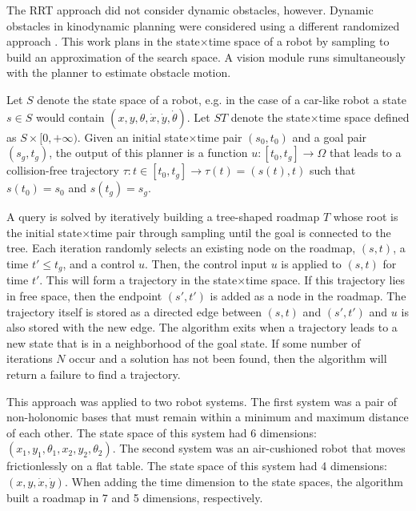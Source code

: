 The RRT approach did not consider dynamic obstacles, however. Dynamic obstacles in kinodynamic planning were considered using a different randomized approach \cite{hsu2002randomized}. This work plans in the state$\times$time space of a robot by sampling to build an approximation of the search space. A vision module runs simultaneously with the planner to estimate obstacle motion.

Let $S$ denote the state space of a robot, e.g. in the case of a car-like robot a state $s \in S$ would contain $(x,y,\theta,\dot{x},\dot{y},\dot{\theta})$. 
Let $ST$ denote the state$\times$time space defined as $S\times[0,+\infty)$. Given an initial state$\times$time pair $(s_0, t_0)$ and a goal pair $(s_g, t_g)$, the output of this planner is a function $u:[t_0, t_g] \rightarrow \Omega$ that leads to a collision-free trajectory $\tau: t \in [t_0, t_g] \rightarrow \tau(t) = (s(t),t)$ such that $s(t_0)=s_0$ and $s(t_g)=s_g$.

A query is solved by iteratively building a tree-shaped roadmap $T$ whose root is the initial state$\times$time pair through sampling until the goal is connected to the tree. Each iteration randomly selects an existing node on the roadmap, $(s,t)$, a time $t' \leq t_g$, and a control $u$. Then, the control input $u$ is applied to $(s,t)$ for time $t'$. This will form a trajectory in the state$\times$time space. If this trajectory lies in free space, then the endpoint $(s',t')$ is added as a node in the roadmap. The trajectory itself is stored as a directed edge between $(s,t)$ and $(s',t')$ and $u$ is also stored with the new edge. The algorithm exits when a trajectory leads to a new state that is in a neighborhood of the goal state. If some number of iterations $N$ occur and a solution has not been found, then the algorithm will return a failure to find a trajectory.

This approach was applied to two robot systems. The first system was a pair of non-holonomic bases that must remain within a minimum and maximum distance of each other. The state space of this system had 6 dimensions: $(x_1, y_1, \theta_1, x_2, y_2, \theta_2)$. The second system was an air-cushioned robot that moves frictionlessly on a flat table. The state space of this system had 4 dimensions: $(x, y, \dot{x}, \dot{y})$. When adding the time dimension to the state spaces, the algorithm built a roadmap in 7 and 5 dimensions, respectively.

